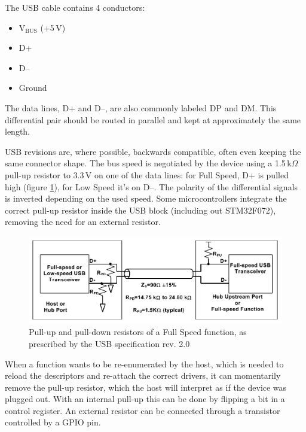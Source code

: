 The \gls{USB} cable contains 4 conductors:

\begin{itemize}\setlength\itemsep{.2em}
	\item V$_\mathrm{BUS}$ (+5\,V)
	\item D+
	\item D--
	\item Ground
\end{itemize}

The data lines, D+ and D--, are also commonly labeled DP and DM. This differential pair should be routed in parallel and kept at approximately the same length.

\gls{USB} revisions are, where possible, backwards compatible, often even keeping the same connector shape. The bus speed is negotiated by the device using a 1.5\,k$\Omega$ pull-up resistor to 3.3\,V on one of the data lines: for Full Speed, D+ is pulled high (figure \ref{fig:usb-pullup-fs}), for Low Speed it's on D--. The polarity of the differential signals is inverted depending on the used speed. Some microcontrollers integrate the correct pull-up resistor inside the \gls{USB} block (including out STM32F072), removing the need for an external resistor.

\begin{figure}
	\centering
	\includegraphics[width=.8\textwidth]{img/usb-pullup-fs.png}
	\caption[USB pull-ups]{\label{fig:usb-pullup-fs}Pull-up and pull-down resistors of a Full Speed function, as prescribed by the USB specification rev. 2.0}
\end{figure}

When a function wants to be re-enumerated by the host, which is needed to reload the descriptors and re-attach the correct drivers, it can momentarily remove the pull-up resistor, which the host will interpret as if the device was plugged out. With an internal pull-up this can be done by flipping a bit in a control register. An external resistor can be connected through a transistor controlled by a \gls{GPIO} pin.


